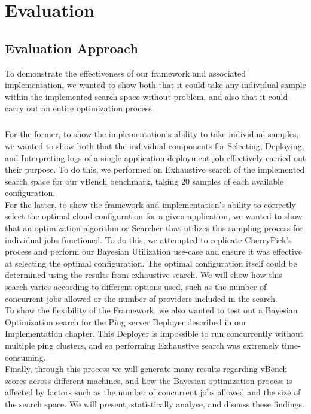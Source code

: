 \documentclass{report}
\begin{document}
\chapter{Evaluation}
\section{Evaluation Approach}
To demonstrate the effectiveness of our framework and associated implementation, we wanted to show both that it could take any individual sample within the implemented search space without problem, and also that it could carry out an entire optimization process. 
\paragraph{}
For the former, to show the implementation's ability to take individual samples, we wanted to show both that the individual components for Selecting, Deploying, and Interpreting logs of a single application deployment job effectively carried out their purpose. To do this, we performed an Exhaustive search of the implemented search space for our vBench benchmark, taking 20 samples of each available configuration.\\
For the latter, to show the framework and implementation's ability to correctly select the optimal cloud configuration for a given application, we wanted to show that an optimization algorithm or Searcher that utilizes this sampling process for individual jobs functioned. To do this, we attempted to replicate CherryPick's\cite{Alipourfard2017} process and perform our Bayesian Utilization use-case and ensure it was effective at selecting the optimal configuration. The optimal configuration itself could be determined using the results from exhaustive search. We will show how this search varies according to different options used, such as the number of concurrent jobs allowed or the number of providers included in the search.\\
To show the flexibility of the Framework, we also wanted to test out a Bayesian Optimization search for the Ping server Deployer described in our Implementation chapter. This Deployer is impossible to run concurrently without multiple ping clusters, and so performing Exhaustive search was extremely time-consuming. \\
Finally, through this process we will generate many results regarding vBench scores across different machines, and how the Bayesian optimization process is affected by factors such as the number of concurrent jobs allowed and the size of the search space. We will present, statistically analyse, and discuss these findings.
\end{document}
